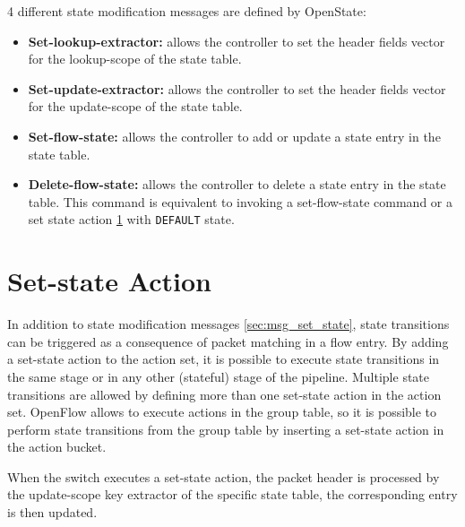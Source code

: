 \label{sec:msg_set_state}

4 different state modification messages are defined by OpenState:

\begin{itemize}
    \item \textbf{Set-lookup-extractor:} allows the controller to set the header fields vector for the lookup-scope of the state table.
    \item \textbf{Set-update-extractor:} allows the controller to set the header fields vector for the update-scope of the state table.
    \item \textbf{Set-flow-state:} allows the controller to add or update a state entry in the state table.
    \item \textbf{Delete-flow-state:} allows the controller to delete a state entry in the state table. This command is equivalent to invoking a set-flow-state command or a set state action \ref{sec:act_set_state} with \texttt{DEFAULT} state.
\end{itemize}


\section{Set-state Action}
\label{sec:act_set_state}
In addition to state modification messages \ref{sec:msg_set_state}, state transitions can be triggered as a consequence of packet matching in a flow entry. By adding a set-state action to the action set, it is possible to execute state transitions in the same stage or in any other (stateful) stage of the pipeline. Multiple state transitions are allowed by defining more than one set-state action in the action set. OpenFlow allows to execute actions in the group table, so it is possible to perform state transitions from the group table by inserting a set-state action in the action bucket.

When the switch executes a set-state action, the packet header is processed by the update-scope key extractor of the specific state table, the corresponding entry is then updated.

